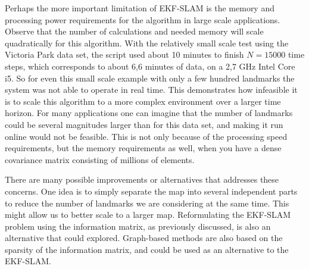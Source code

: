 Perhaps the more important limitation of EKF-SLAM is the memory and processing power requirements for the algorithm in large scale applications. Observe that the number of calculations and needed memory will scale quadratically for this algorithm. With the relatively small scale test using the Victoria Park data set, the script used about 10 minutes to finish $N=15000$ time steps, which corresponds to about 6,6 minutes of data, on a 2,7 GHz Intel Core i5. So for even this small scale example with only a few hundred landmarks the system was not able to operate in real time. This demonstrates how infeasible it is to scale this algorithm to a more complex environment over a larger time horizon. For many applications one can imagine that the number of landmarks could be several magnitudes larger than for this data set, and making it run online would not be feasible. This is not only because of the processing speed requirements, but the memory requirements as well, when you have a dense covariance matrix consisting of millions of elements.

There are many possible improvements or alternatives that addresses these concerns. One idea is to simply separate the map into several independent parts to reduce the number of landmarks we are considering at the same time. This might allow us to better scale to a larger map. Reformulating the EKF-SLAM problem using the information matrix, as previously discussed, is also an alternative that could explored. Graph-based methods are also based on the sparsity of the information matrix, and could be used as an alternative to the EKF-SLAM. 

